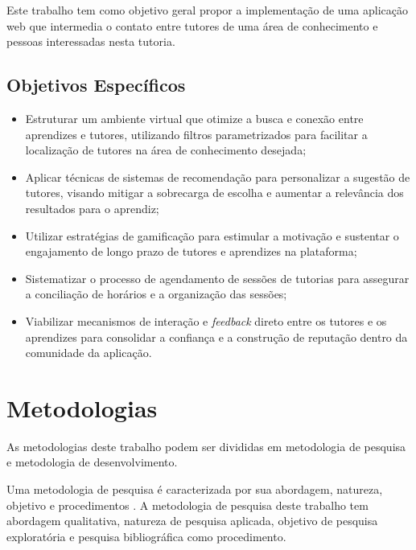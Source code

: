 Este trabalho tem como objetivo geral propor a implementação de uma aplicação web que intermedia o contato entre tutores de uma área de conhecimento e pessoas interessadas nesta tutoria.

\subsection[Objetivos específicos]{Objetivos Específicos}

\begin{itemize}
    \item Estruturar um ambiente virtual que otimize a busca e conexão entre aprendizes e tutores, utilizando filtros parametrizados para facilitar a localização de tutores na área de conhecimento desejada;
    
    \item Aplicar técnicas de sistemas de recomendação para personalizar a sugestão de tutores, visando mitigar a sobrecarga de escolha e aumentar a relevância dos resultados para o aprendiz;
    
    \item Utilizar estratégias de gamificação para estimular a motivação e sustentar o engajamento de longo prazo de tutores e aprendizes na plataforma;

    \item Sistematizar o processo de agendamento de sessões de tutorias para assegurar a conciliação de horários e a organização das sessões;
    
    \item Viabilizar mecanismos de interação e \textit{feedback} direto entre os tutores e os aprendizes para consolidar a confiança e a construção de reputação dentro da comunidade da aplicação.
    
\end{itemize}

\section[Metodologias]{Metodologias}
\label{sec:metodologia}

As metodologias deste trabalho podem ser divididas em metodologia de pesquisa e metodologia de desenvolvimento.

Uma metodologia de pesquisa é caracterizada por sua abordagem, natureza, objetivo e procedimentos \cite{gerhardt2009metodos}. A metodologia de pesquisa deste trabalho tem abordagem qualitativa, natureza de pesquisa aplicada, objetivo de pesquisa exploratória e pesquisa bibliográfica como procedimento.

